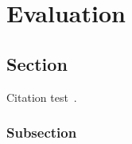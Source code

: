 
\chapter{Evaluation}\label{chapter:Evaluation}

\section{Section}
Citation test~\parencite{latex}.

\subsection{Subsection}
